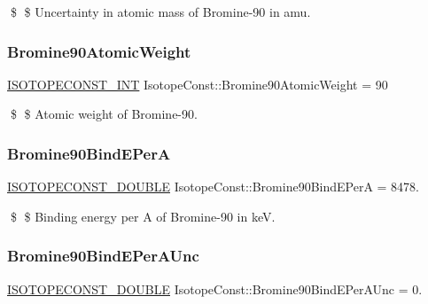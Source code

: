 \$ \$ Uncertainty in atomic mass of Bromine-\/90 in amu. \mbox{\label{group___isotope_const-_bromine-_br90_ga901261d7adb51c978168aac247a44a97}} 
\subsubsection{\texorpdfstring{Bromine90\+Atomic\+Weight}{Bromine90AtomicWeight}}
{\footnotesize\ttfamily \mbox{\hyperlink{group___isotope_const-_macros_ga5f18360b3e99483a35c32d789e62621c}{I\+S\+O\+T\+O\+P\+E\+C\+O\+N\+S\+T\+\_\+\+I\+NT}} Isotope\+Const\+::\+Bromine90\+Atomic\+Weight = 90}

\$ \$ Atomic weight of Bromine-\/90. \mbox{\label{group___isotope_const-_bromine-_br90_ga71c5fc618fdc5ea18e615f1462820177}} 
\subsubsection{\texorpdfstring{Bromine90\+Bind\+E\+PerA}{Bromine90BindEPerA}}
{\footnotesize\ttfamily \mbox{\hyperlink{group___isotope_const-_macros_ga8f45a7272ce02c0b4c65c44636ed719a}{I\+S\+O\+T\+O\+P\+E\+C\+O\+N\+S\+T\+\_\+\+D\+O\+U\+B\+LE}} Isotope\+Const\+::\+Bromine90\+Bind\+E\+PerA = 8478.}

\$ \$ Binding energy per A of Bromine-\/90 in keV. \mbox{\label{group___isotope_const-_bromine-_br90_gad6ada0c821d45e0ac82979b0f2861451}} 
\subsubsection{\texorpdfstring{Bromine90\+Bind\+E\+Per\+A\+Unc}{Bromine90BindEPerAUnc}}
{\footnotesize\ttfamily \mbox{\hyperlink{group___isotope_const-_macros_ga8f45a7272ce02c0b4c65c44636ed719a}{I\+S\+O\+T\+O\+P\+E\+C\+O\+N\+S\+T\+\_\+\+D\+O\+U\+B\+LE}} Isotope\+Const\+::\+Bromine90\+Bind\+E\+Per\+A\+Unc = 0.}

